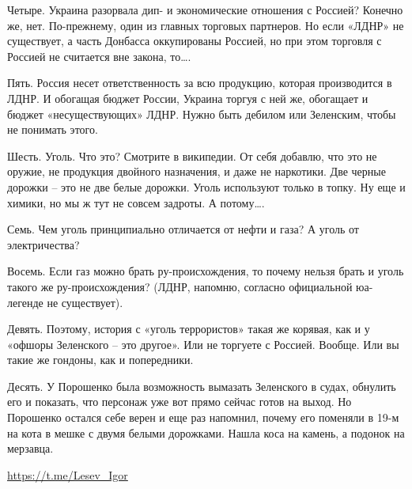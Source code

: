 Четыре. Украина разорвала дип- и экономические отношения с Россией? Конечно же,
нет. По-прежнему, один из главных торговых партнеров. Но если «ЛДНР» не
существует, а часть Донбасса оккупированы Россией, но при этом торговля с
Россией не считается вне закона, то….

Пять. Россия несет ответственность за всю продукцию, которая производится в
ЛДНР. И обогащая бюджет России, Украина торгуя с ней же, обогащает и бюджет
«несуществующих» ЛДНР. Нужно быть дебилом или Зеленским, чтобы не понимать
этого.

Шесть. Уголь. Что это? Смотрите в википедии. От себя добавлю, что это не
оружие, не продукция двойного назначения, и даже не наркотики. Две черные
дорожки – это не две белые дорожки. Уголь используют только в топку. Ну еще и
химики, но мы ж тут не совсем задроты. А потому….

Семь. Чем уголь принципиально отличается от нефти и газа? А уголь от
электричества?

Восемь. Если газ можно брать ру-происхождения, то почему нельзя брать и уголь
такого же ру-происхождения? (ЛДНР, напомню, согласно официальной юа-легенде не
существует).

Девять. Поэтому, история с «уголь террористов» такая же корявая, как и у
«офшоры Зеленского – это другое». Или не торгуете с Россией. Вообще. Или вы
такие же гондоны, как и попередники.

Десять. У Порошенко была возможность вымазать Зеленского в судах, обнулить его
и показать, что персонаж уже вот прямо сейчас готов на выход. Но Порошенко
остался себе верен и еще раз напомнил, почему его поменяли в 19-м на кота в
мешке с двумя белыми дорожками. Нашла коса на камень, а подонок на мерзавца.

\url{https://t.me/Lesev_Igor}

